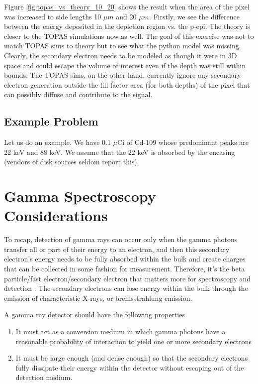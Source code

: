 \documentclass{article}
\begin{document}
Figure \ref{fig:topas_vs_theory_10_20} shows the result when the area of the pixel was increased to side lengths 10 $\mu m$ and 20 $\mu m$. Firstly, we see the difference between the energy deposited 
in the depletion region vs. the p-epi. The theory is closer to the TOPAS simulations now as well. The goal of this exercise was not to match TOPAS sims to theory but to see what the python model was missing.
Clearly, the secondary electron needs to be modeled as though it were in 3D space and could escape the volume of interest even if the depth was still within bounds. The TOPAS sims, on the other hand, currently ignore any secondary electron generation 
outside the fill factor area (for both depths) of the pixel that can possibly diffuse and contribute to the signal. 






\subsection{Example Problem}




Let us do an example. We have 0.1 $\mu$Ci of Cd-109 whose predominant peaks are 22 keV and 88 keV. We assume that the 22 keV is absorbed by the encasing (vendors of disk sources seldom report this).




\pagebreak
\newpage

\section{Gamma Spectroscopy Considerations}

To recap, detection of gamma rays can occur only when the gamma photons transfer all or part of their energy to an electron, and then this secondary electron's energy needs to be 
fully absorbed within the bulk and create charges that can be collected in some fashion for measurement. Therefore, it's the beta particle/fast electron/secondary electron that matters 
more for spectroscopy and detection \cite{Knoll2000}. The secondary electrons can lose energy within the bulk through the emission of characteristic X-rays, or bremsstrahlung emission. 


A gamma ray detector should have the following properties \cite{Knoll2000}
\begin{enumerate}
    \item It must act as a conversion medium in which gamma photons have a reasonable probability of interaction to yield one or more secondary electrons
    \item It must be large enough (and dense enough) so that the secondary electrons fully dissipate their energy within the detector without escaping out of the detection medium.  
\end{enumerate}
\end{document}
